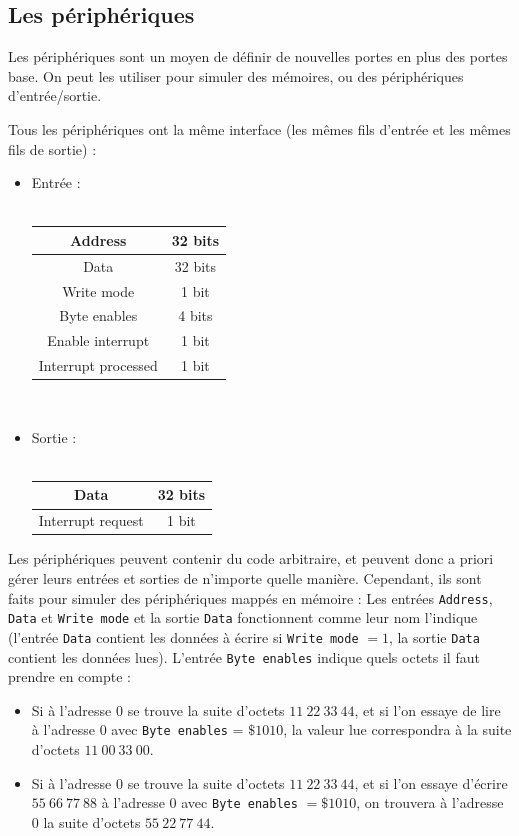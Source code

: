 \documentclass[13pt]{article}
\begin{document}
\subsection{Les périphériques}


Les périphériques sont un moyen de définir de nouvelles portes en plus des
portes base. On peut les utiliser pour simuler des mémoires, ou des
périphériques d'entrée/sortie.

Tous les périphériques ont la même interface (les mêmes fils d'entrée et
les mêmes fils de sortie) :
\begin{itemize}
\item Entrée :
\text{}\\
\text{}\\
  \begin{tabular}{ | c | c | }
    \hline
    Address &  32 bits \\
    \hline
    Data & 32 bits \\
    \hline
    Write mode & 1 bit\\
    \hline
    Byte enables &  4 bits\\
    \hline
    Enable interrupt & 1 bit\\
    \hline
    Interrupt processed & 1 bit\\
    \hline
  \end{tabular}
\text{}\\
\item Sortie :
\text{}\\
\text{}\\
 \begin{tabular}{ | c | c | }
    \hline
    Data &  32 bits \\
    \hline
    Interrupt request & 1 bit \\
    \hline
  \end{tabular}
\end{itemize}

Les périphériques peuvent contenir du code arbitraire, et peuvent donc a
priori gérer leurs entrées et sorties de n'importe quelle
manière. Cependant, ils sont faits pour simuler des périphériques mappés en
mémoire : Les entrées \texttt{Address}, \texttt{Data} et \texttt{Write mode} et
la sortie \texttt{Data} 
fonctionnent comme leur nom l'indique (l'entrée \texttt{Data} contient les données
à écrire si \texttt{Write mode} $=  1$, la sortie \texttt{Data} contient les données lues).
L'entrée \texttt{Byte enables} indique quels octets il faut prendre en compte :
\begin{itemize}
\item   Si à l'adresse $0$ se trouve la suite d'octets $11\ 22\ 33\ 44$, et si l'on
    essaye de lire à l'adresse $0$ avec \texttt{Byte enables} = $\$1010$, la valeur lue
    correspondra à la suite d'octets $11\ 00\ 33\ 00$.

\item  Si à l'adresse $0$ se trouve la suite d'octets $11\ 22\ 33\ 44$, et si l'on
    essaye d'écrire $55\ 66\ 77\ 88$ à l'adresse $0$ avec \texttt{Byte enables} $= \$1010$,
    on trouvera à l'adresse $0$ la suite d'octets $55\ 22\ 77\ 44$.
\end{itemize}
\end{document}
